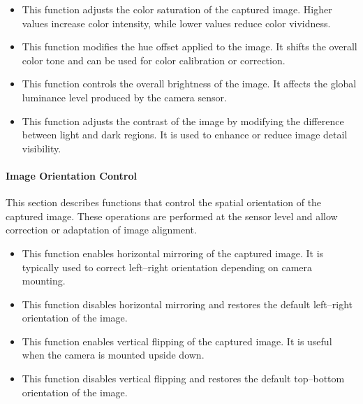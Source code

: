 \begin{itemize}
	\item {} 
	
	This function adjusts the color saturation of the captured image. Higher values increase color intensity, while lower values reduce color vividness.
	
	\item {} 
	
	This function modifies the hue offset applied to the image. It shifts the overall color tone and can be used for color calibration or correction.
	
	\item {} 
	
	This function controls the overall brightness of the image. It affects the global luminance level produced by the camera sensor.
	
	\item {} 
	
	This function adjusts the contrast of the image by modifying the difference between light and dark regions. It is used to enhance or reduce image detail visibility.
\end{itemize}

\paragraph{Image Orientation Control}
This section describes functions that control the spatial orientation of the captured image. These operations are performed at the sensor level and allow correction or adaptation of image alignment.

\begin{itemize}
	\item {} 
	
	This function enables horizontal mirroring of the captured image. It is typically used to correct left–right orientation depending on camera mounting.
	
	\item {} 
	
	This function disables horizontal mirroring and restores the default left–right orientation of the image.
	
	\item {} 
	
	This function enables vertical flipping of the captured image. It is useful when the camera is mounted upside down.
	
	\item {} 
	
	This function disables vertical flipping and restores the default top–bottom orientation of the image.
\end{itemize}


